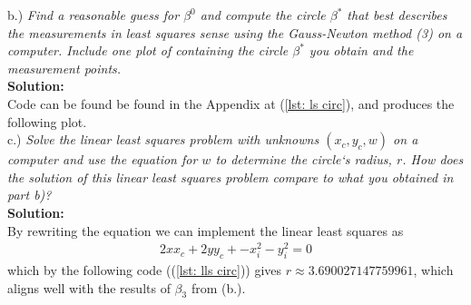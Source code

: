 \documentclass[12pt,
               a4paper,
               article,
               oneside,
               english,oldfontcommands]{memoir}
\let\oldref\ref
\renewcommand{\ref}[1]{(\oldref{#1})}
\newcommand{\spaze}{\vspace{4mm}\\}
\begin{document}
b.) \emph{Find a reasonable guess for $\beta^{0}$ and compute the circle $\beta^{*}$ that best describes the measurements in least squares sense using the Gauss-Newton method (3) on a computer. Include one plot of containing the circle $\beta^{*}$ you obtain and the measurement points.} \spaze 
\textbf{Solution:} \spaze
Code can be found be found in the Appendix at \ref{lst: ls circ}, and produces the following plot. \spaze
c.) \emph{Solve the linear least squares problem with unknowns $(x_c, y_c, w)$ on a computer and use the equation for $w$ to determine the circle`s radius, $r$. How does the solution of this linear least squares problem compare to what you obtained in part b)?}\spaze 
\textbf{Solution:}\spaze 
By rewriting the equation we can implement the linear least squares as 
\begin{align*}
2xx_c + 2yy_c + -x_{i}^2 - y_{i}^2 = 0
\end{align*}
which by the following code (\ref{lst: lls circ}) gives $r \approx 3.690027147759961$, which aligns well with the results of $\beta_3$ from (b.).
\end{document}

